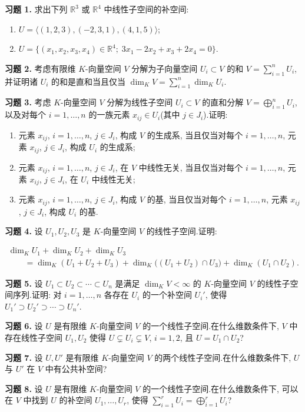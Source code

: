 \aufgaben

\noindent\textbf{习题 1.} 求出下列 $\mathbb{R}^3$ 或 $\mathbb{R}^4$ 中线性子空间的补空间:
\begin{enumerate}
\item[(i)] $U = \langle (1, 2, 3), (-2, 3, 1), (4, 1, 5) \rangle$;
\item[(ii)] $U = \{(x_1, x_2, x_3, x_4) \in \mathbb{R}^4;\; 3x_1 - 2x_2 + x_3 + 2x_4 = 0\}$.
\end{enumerate}

\medskip
\noindent\textbf{习题 2.} 考虑有限维 $K$-向量空间 $V$ 分解为子向量空间 $U_i \subset V$ 的和 $V = \sum_{i = 1}^{n} U_i$, 并证明诸 $U_i$ 的和是直和当且仅当 $\dim_K V = \sum_{i = 1}^{n} \dim_K U_i$.

\medskip
\noindent\textbf{习题 3.} 考虑 $K$-向量空间 $V$ 分解为线性子空间 $U_i \subset V$ 的直和分解 $V = \bigoplus_{i = 1}^{n} U_i$, 以及对每个 $i = 1, \ldots, n$ 的一族元素 $x_{ij} \in U_i$(其中 $j \in J_i$).证明:
\begin{enumerate}
\item[(i)] 元素 $x_{ij}$, $i = 1, \ldots, n$, $j \in J_i$, 构成 $V$ 的生成系, 当且仅当对每个 $i = 1, \ldots, n$, 元素 $x_{ij}$, $j \in J_i$, 构成 $U_i$ 的生成系;
\item[(ii)] 元素 $x_{ij}$, $i = 1, \ldots, n$, $j \in J_i$, 在 $V$ 中线性无关, 当且仅当对每个 $i = 1, \ldots, n$, 元素 $x_{ij}$, $j \in J_i$, 在 $U_i$ 中线性无关;
\item[(iii)] 元素 $x_{ij}$, $i = 1, \ldots, n$, $j \in J_i$, 构成 $V$ 的基, 当且仅当对每个 $i = 1, \ldots, n$, 元素 $x_{ij}$, $j \in J_i$, 构成 $U_i$ 的基.
\end{enumerate}

\medskip
\noindent\textbf{习题 4.} 设 $U_1, U_2, U_3$ 是 $K$-向量空间 $V$ 的线性子空间.证明:

\[
\begin{array}{l}
\dim_K U_1 + \dim_K U_2 + \dim_K U_3 \\
\qquad = \dim_K (U_1 + U_2 + U_3) + \dim_K \big((U_1 + U_2) \cap U_3\big) + \dim_K (U_1 \cap U_2)\text{.}
\end{array}
\]

\medskip
\noindent\textbf{习题 5.} 设 $U_1 \subset U_2 \subset \cdots \subset U_n$ 是满足 $\dim_K V < \infty$ 的 $K$-向量空间 $V$ 的线性子空间序列.证明: 对 $i = 1, \ldots, n$ 各存在 $U_i$ 的一个补空间 $U_i'$, 使得 $U_1' \supset U_2' \supset \cdots \supset U_n'$.

\medskip
\noindent\textbf{习题 6.} 设 $U$ 是有限维 $K$-向量空间 $V$ 的一个线性子空间.在什么维数条件下, $V$ 中存在线性子空间 $U_1, U_2$ 使得 $U \subsetneq U_i \subsetneq V$, $i = 1, 2$, 且 $U = U_1 \cap U_2$?

\medskip
\noindent\textbf{习题 7.} 设 $U, U'$ 是有限维 $K$-向量空间 $V$ 的两个线性子空间.在什么维数条件下, $U$ 与 $U'$ 在 $V$ 中有公共补空间?

\medskip
\noindent\textbf{习题 8.} 设 $U$ 是有限维 $K$-向量空间 $V$ 的一个线性子空间.在什么维数条件下, 可以在 $V$ 中找到 $U$ 的补空间 $U_1, \ldots, U_r$, 使得 $\sum_{i = 1}^{r} U_i = \bigoplus_{i = 1}^{r} U_i$?
